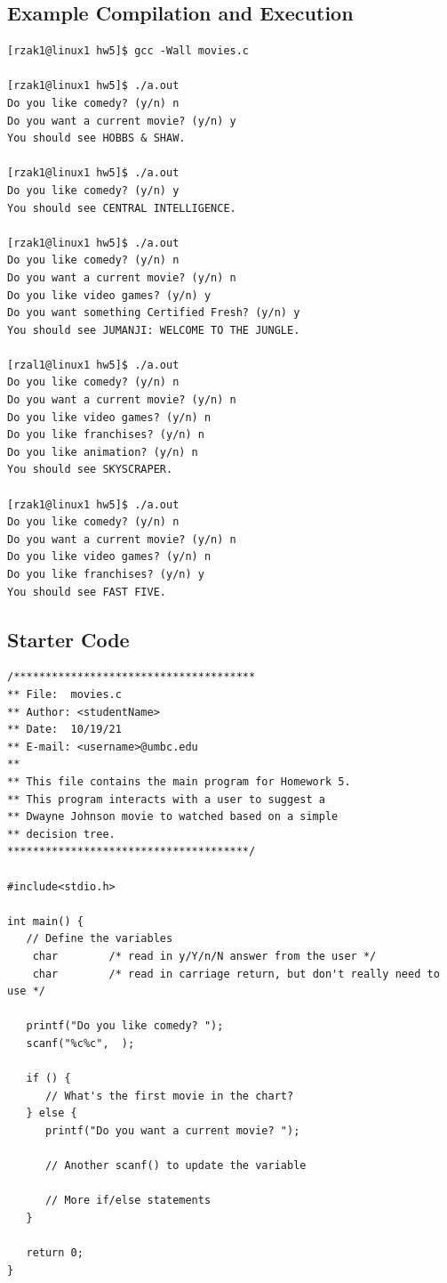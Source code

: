\documentclass[letter,11pt]{article}
\begin{document}
\subsection*{Example Compilation and Execution}
\begin{verbatim}
[rzak1@linux1 hw5]$ gcc -Wall movies.c

[rzak1@linux1 hw5]$ ./a.out
Do you like comedy? (y/n) n
Do you want a current movie? (y/n) y
You should see HOBBS & SHAW.

[rzak1@linux1 hw5]$ ./a.out
Do you like comedy? (y/n) y
You should see CENTRAL INTELLIGENCE.

[rzak1@linux1 hw5]$ ./a.out
Do you like comedy? (y/n) n
Do you want a current movie? (y/n) n
Do you like video games? (y/n) y
Do you want something Certified Fresh? (y/n) y
You should see JUMANJI: WELCOME TO THE JUNGLE.

[rzal1@linux1 hw5]$ ./a.out
Do you like comedy? (y/n) n
Do you want a current movie? (y/n) n
Do you like video games? (y/n) n
Do you like franchises? (y/n) n
Do you like animation? (y/n) n
You should see SKYSCRAPER.

[rzak1@linux1 hw5]$ ./a.out
Do you like comedy? (y/n) n
Do you want a current movie? (y/n) n
Do you like video games? (y/n) n
Do you like franchises? (y/n) y
You should see FAST FIVE.
\end{verbatim}

\subsection*{Starter Code}
\begin{verbatim}
/**************************************
** File:  movies.c
** Author: <studentName>
** Date:  10/19/21
** E-mail: <username>@umbc.edu
**
** This file contains the main program for Homework 5.
** This program interacts with a user to suggest a
** Dwayne Johnson movie to watched based on a simple
** decision tree.
**************************************/

#include<stdio.h>

int main() {
   // Define the variables
    char        /* read in y/Y/n/N answer from the user */
    char        /* read in carriage return, but don't really need to use */

   printf("Do you like comedy? ");
   scanf("%c%c",  );

   if () {
      // What's the first movie in the chart?
   } else {
      printf("Do you want a current movie? ");
      
      // Another scanf() to update the variable

      // More if/else statements
   }

   return 0;
}
\end{verbatim}
\end{document}
